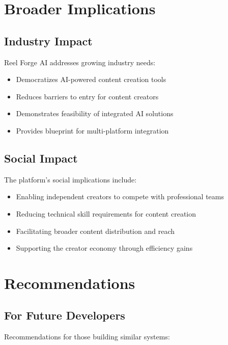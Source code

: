 \section{Broader Implications}

\subsection{Industry Impact}

Reel Forge AI addresses growing industry needs:

\begin{itemize}
    \item Democratizes AI-powered content creation tools
    \item Reduces barriers to entry for content creators
    \item Demonstrates feasibility of integrated AI solutions
    \item Provides blueprint for multi-platform integration
\end{itemize}

\subsection{Social Impact}

The platform's social implications include:

\begin{itemize}
    \item Enabling independent creators to compete with professional teams
    \item Reducing technical skill requirements for content creation
    \item Facilitating broader content distribution and reach
    \item Supporting the creator economy through efficiency gains
\end{itemize}

\section{Recommendations}

\subsection{For Future Developers}

Recommendations for those building similar systems:

